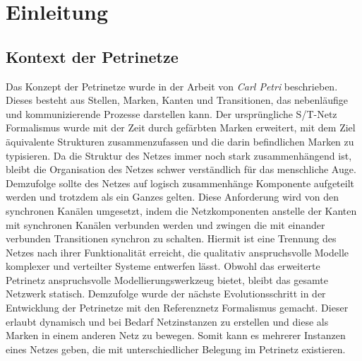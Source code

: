 \chapter{Einleitung}

\section{Kontext der Petrinetze} 
Das Konzept der Petrinetze wurde in der Arbeit von \textit{Carl Petri} beschrieben. 
Dieses besteht aus Stellen, Marken, Kanten und Transitionen, das nebenläufige und kommunizierende Prozesse darstellen kann.
Der ursprüngliche S/T-Netz Formalismus wurde mit der Zeit durch gefärbten Marken erweitert, mit dem Ziel äquivalente Strukturen zusammenzufassen und die darin befindlichen Marken zu typisieren.
Da die Struktur des Netzes immer noch stark zusammenhängend ist, bleibt die Organisation des Netzes schwer verständlich für das menschliche Auge.\newline 
Demzufolge sollte des Netzes auf logisch zusammenhänge Komponente aufgeteilt werden und trotzdem als ein Ganzes gelten.
Diese Anforderung wird von den synchronen Kanälen umgesetzt, indem die Netzkomponenten anstelle der Kanten mit synchronen Kanälen verbunden werden und zwingen die mit einander verbunden Transitionen synchron zu schalten.
Hiermit ist eine Trennung des Netzes nach ihrer Funktionalität erreicht, die qualitativ anspruchsvolle Modelle komplexer und verteilter Systeme entwerfen lässt.\bigbreak
Obwohl das erweiterte Petrinetz anspruchsvolle Modellierungswerkzeug bietet, bleibt das gesamte Netzwerk statisch.
Demzufolge wurde der nächste Evolutionsschritt in der Entwicklung der Petrinetze mit den Referenznetz Formalismus gemacht. 
Dieser erlaubt dynamisch und bei Bedarf Netzinstanzen zu erstellen und diese als Marken in einem anderen Netz zu bewegen. 
Somit kann es mehrerer Instanzen eines Netzes geben, die mit unterschiedlicher Belegung im Petrinetz existieren. %

